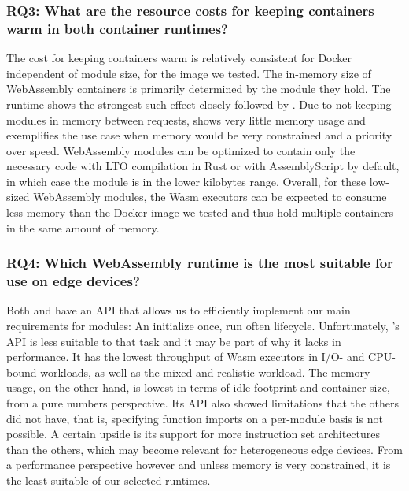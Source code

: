 \subsubsection*{RQ3: What are the resource costs for keeping containers warm in both container runtimes?}

The cost for keeping containers warm is relatively consistent for Docker independent of module size, for the image we tested. The in-memory size of WebAssembly containers is primarily determined by the module they hold. The  runtime shows the strongest such effect closely followed by . Due to not keeping modules in memory between requests,  shows very little memory usage and exemplifies the use case when memory would be very constrained and a priority over speed. WebAssembly modules can be optimized to contain only the necessary code with LTO compilation in Rust or with AssemblyScript by default, in which case the module is in the lower kilobytes range.
Overall, for these low-sized WebAssembly modules, the Wasm executors can be expected to consume less memory than the Docker image we tested and thus hold multiple containers in the same amount of memory.


\subsubsection*{RQ4: Which WebAssembly runtime is the most suitable for use on edge devices?}

Both  and  have an API that allows us to efficiently implement our main requirements for modules: An initialize once, run often lifecycle. Unfortunately, 's API is less suitable to that task and it may be part of why it lacks in performance. It has the lowest throughput of Wasm executors in I/O- and CPU-bound workloads, as well as the mixed and realistic workload. The memory usage, on the other hand, is lowest in terms of idle footprint and container size, from a pure numbers perspective. Its API also showed limitations that the others did not have, that is, specifying function imports on a per-module basis is not possible. A certain upside is its support for more instruction set architectures than the others, which may become relevant for heterogeneous edge devices. From a performance perspective however and unless memory is very constrained, it is the least suitable of our selected runtimes.

